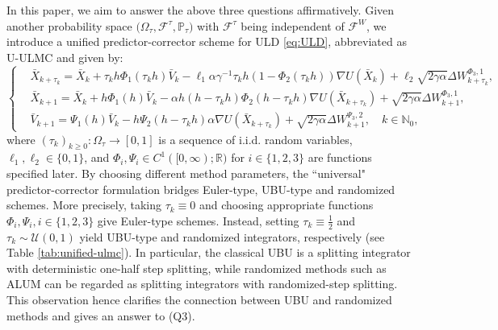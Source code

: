 \documentclass[12pt]{article}
\numberwithin{equation}{section}
\begin{document}
In this paper, we aim to answer the above three questions affirmatively. 
Given another probability space $\big(\Omega_\tau,\mathcal{F}^\tau, \mathbb{P}_\tau\big)$ with $\mathcal{F}^\tau$
being independent of $\mathcal{F}^W$, we introduce a unified predictor-corrector scheme for ULD \eqref{eq:ULD}, abbreviated as U-ULMC and given by: 
\begin{equation}
\label{eq:intro-uni-process}
\left\{
\begin{aligned}
&\bar{X}_{k+\tau_k}
=
\bar{X}_k
+ 
\tau_k h\Phi_1(\tau_kh)\bar{V}_k
-
\ell_1 \alpha \gamma^{-1}
\tau_k h 
(1-\Phi_2(\tau_k h))
\nabla U (\bar{X}_k)
+
\ell_2\sqrt{2\gamma \alpha}
\Delta W_{k+\tau_k}^{\Phi_3,1}, \\
&\bar{X}_{k+1}
=
\bar{X}_k
+
h\Phi_1(h)\bar{V}_k
-
\alpha 
h(h-\tau_k h)\Phi_2(h-\tau_kh)\nabla U(\bar{X}_{k+\tau_k})
+
\sqrt{2\gamma \alpha}
\Delta W_{k+1}^{\Phi_3,1},\\
&\bar{V}_{k+1}
=
\Psi_1(h)\bar{V}_k
-
h\Psi_2(h-\tau_k h)\alpha
\nabla U(\bar{X}_{k+\tau_k})
+
\sqrt{2\gamma\alpha}
\Delta W_{k+1}^{\Psi_3,2},
\quad k \in \mathbb{N}_0,
\end{aligned}
\right.
\end{equation}
where
$(\tau_k)_{k\geq0} \colon \Omega_\tau \to [0,1]$ is a sequence of i.i.d. random variables, $\ell_1,\ell_2\in\{0,1\}$, and $\Phi_i, \Psi_i \in C^1([0,\infty); \mathbb{R})$ for $i \in \{1,2,3\}$ are functions specified later.
%
By choosing different method parameters, the ``universal" predictor-corrector formulation bridges Euler-type, UBU-type and randomized schemes. More precisely, taking $\tau_k \equiv 0 $ and choosing appropriate functions $\Phi_i, \Psi_i, i \in \{ 1,2,3\}$ give Euler-type schemes. Instead, setting $\tau_k \equiv \tfrac12 $ and $\tau_k \sim \mathcal{U}(0,1)$ yield UBU-type and randomized integrators, respectively (see Table \ref{tab:unified-ulmc}). In particular, the classical UBU is a splitting integrator with deterministic one-half step splitting, while randomized methods such as ALUM can be regarded as splitting integrators with randomized-step splitting. This observation hence clarifies the connection between UBU and randomized methods and gives an answer to (Q3).
\end{document}
